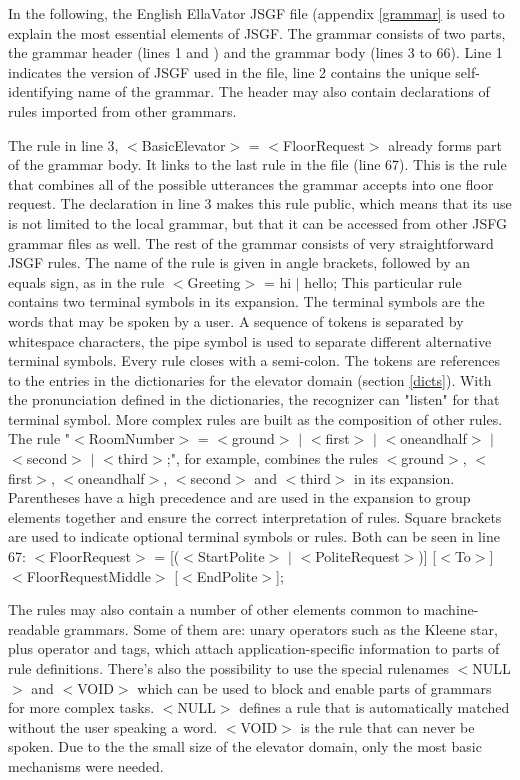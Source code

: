 \documentclass[a4paper, 12pt]{article}
\begin{document}
In the following, the English EllaVator JSGF file (appendix \ref{grammar} is used to explain the most essential elements of JSGF.
The grammar consists of two parts, the grammar header (lines 1 and ) and the grammar body (lines 3 to 66).
Line 1 indicates the version of JSGF used in the file, line 2 contains the unique self-identifying name of the grammar.
The header may also contain declarations of rules imported from other grammars.


The rule in line 3, $<$BasicElevator$>$ = $<$FloorRequest$>$ already forms part of the grammar body.
It links to the last rule in the file (line 67).
This is the rule that combines all of the possible utterances the grammar accepts into one floor request.
The declaration in line 3 makes this rule public, which means that its use is not limited to the local grammar, but that it can be accessed from other JSFG grammar files as well.
The rest of the grammar consists of very straightforward JSGF rules.
The name of the rule is given in angle brackets, followed by an equals sign, as in the rule $<$Greeting$>$ = hi $|$ hello;
This particular rule contains two terminal symbols in its expansion.
The terminal symbols are the words that may be spoken by a user.
A sequence of tokens is separated by whitespace characters, the pipe symbol is used to separate different alternative terminal symbols.
Every rule closes with a semi-colon.
The tokens are references to the entries in the dictionaries for the elevator domain (section \ref{dicts}).
With the pronunciation defined in the dictionaries, the recognizer can "listen" for that terminal symbol.
More complex rules are built as the composition of other rules.
The rule "$<$RoomNumber$>$ = $<$ground$>$ $|$ $<$first$>$ $|$ $<$oneandhalf$>$ $|$ $<$second$>$ $|$ $<$third$>$;", for example, combines the rules $<$ground$>$, $<$first$>$, $<$oneandhalf$>$, $<$second$>$ and  $<$third$>$ in its expansion.
 Parentheses have a high precedence and  are used in the expansion to group elements together and ensure the correct interpretation of rules.
Square brackets are used to indicate optional terminal symbols or rules.
Both can be seen in line 67: $<$FloorRequest$>$ =  [($<$StartPolite$>$ $|$ $<$PoliteRequest$>$)]  [$<$To$>$] $<$FloorRequestMiddle$>$ [$<$EndPolite$>$];


The rules may also contain a number of other elements common to machine-readable grammars.
Some of them are: unary operators such as the Kleene star, plus operator and tags, which attach application-specific information to parts of rule definitions.
There's also the possibility to use the special rulenames $<$NULL$>$ and $<$VOID$>$ which can be used to block and enable parts of grammars for more complex tasks.
$<$NULL$>$ defines a rule that is automatically matched without the user speaking a word.
$<$VOID$>$ is the rule that can never be spoken.
Due to the the small size of the elevator domain, only the most basic mechanisms were needed.
\end{document}

